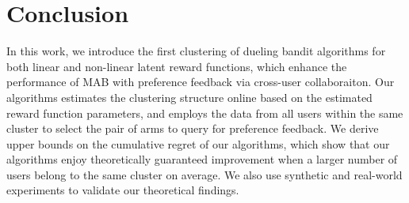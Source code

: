 \section{Conclusion}
In this work, we introduce the first clustering of dueling bandit algorithms for both linear and non-linear latent reward functions, which enhance the performance of MAB with preference feedback via cross-user collaboraiton.
Our algorithms estimates the clustering structure online 
based on the
estimated reward function parameters, and employs the data from all users within the same cluster to select the pair of arms to query for preference feedback.
We derive upper bounds on the cumulative regret of our algorithms, which show that our algorithms enjoy theoretically guaranteed improvement when a larger number of users belong to the same cluster on average. We also use synthetic and real-world experiments to validate our theoretical findings.

